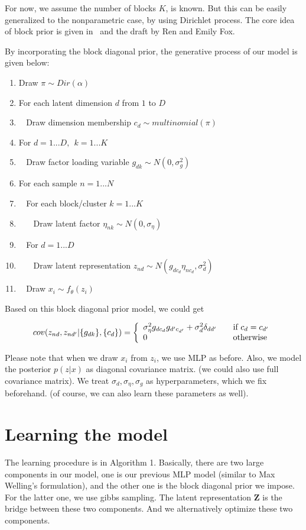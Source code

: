 For now, we assume the number of blocks $K$, is known. But this can be easily generalized to the nonparametric case, by using Dirichlet process. The core idea of block prior is given in~\cite{palla2012nonparametric} and the draft by Ren and Emily Fox.

By incorporating the block diagonal prior, the generative process of our model is given below:

\begin{enumerate}[noitemsep]
\item Draw $\pi\sim Dir(\alpha)$
\item For each latent dimension $d$ from $1$ to $D$
\item $~~~~$Draw dimension membership $c_d\sim multinomial(\pi)$
\item For $d=1...D, ~~k=1...K$
\item $~~~~$Draw factor loading variable $g_{dk}\sim N(0, \sigma_g^2)$
\item For each sample $n=1...N$
\item $~~~~$For each block/cluster $k=1...K$
\item $~~~~~~~~$Draw latent factor $\eta_{nk}\sim N(0, \sigma_{\eta})$
\item $~~~~$For $d=1...D$
\item $~~~~~~~~$Draw latent representation $z_{nd}\sim N(g_{dc_d}\eta_{nc_d}, \sigma_d^2)$
\item $~~~~$Draw $x_i \sim f_{\theta}(z_i)$
\end{enumerate}

Based on this block diagonal prior model, we could get

\[ cov(z_{nd}, z_{nd'}|\{g_{dk}\}, \{c_d\}) = \left\{
  \begin{array}{l l}
    \sigma_{\eta}^2g_{dc_d}g_{d'c_{d'}}+\sigma_d^2\delta_{dd'} & \quad \text{if $c_d=c_{d'}$}\\
    0 & \quad \text{otherwise}
  \end{array} \right.\]

Please note that when we draw $x_i$ from $z_i$, we use MLP as before. Also, we model the posterior $p(z|x)$ as diagonal covariance matrix. (we could also use full covariance matrix). We treat $\sigma_d, \sigma_{\eta}, \sigma_g$ as hyperparameters, which we fix beforehand. (of course, we can also learn these parameters as well).

\section{Learning the model}
The learning procedure is in Algorithm 1. Basically, there are two large components in our model, one is our previous MLP model (similar to Max Welling's formulation), and the other one is the block diagonal prior we impose. For the latter one, we use gibbs sampling. The latent representation $\mathbf{Z}$ is the bridge between these two components. And we alternatively optimize these two components.


